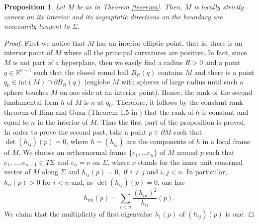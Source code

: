 \documentclass[11pt]{amsart}
\theoremstyle{plain}
\newtheorem{proposition}[theorem]{Proposition}
\numberwithin{equation}{section}
\numberwithin{theorem}{section}
\begin{document}
\begin{proposition}
	\label{lema}
	Let $M$ be as in Theorem \ref{teorema}.  Then, $M$ is locally strictly convex on its interior and its asymptotic directions on the boundary are necessarily tangent to $\Sigma$. 
\end{proposition}
\begin{proof}
First we notice that $M$ has an interior elliptic point, that is, there is an interior point of $M$ where all the principal curvatures are positive. In fact, since $M$ is not part of a hyperplane, then we easily find a radius $R>0$ and a point $q\in \mathbb{R}^{n+1}$ such that the closed round ball $B_R(q)$ contains $M$ and there is a point $q_0\in  \textrm{int} (M)\cap\partial B_R(q)$ (englobe $M$ with spheres of large radius until such a sphere touches $M$ on one side at an interior point). Hence, the rank of the second fundamental form $h$  of $M$ is $n$ at $q_0$. Therefore, it follows by the constant rank theorem of Bian and Guan (Theorem 1.5 in \cite{BG1}) that the rank of $h$ is constant and equal to $n$ in the interior of $M$. Thus the first part of the proposition is proved. In order to prove the second part,
take a point $p\in \partial M$ such that $\det (h_{ij})(p)=0$, where $h=(h_{ij})$ are the components of $h$ in a local frame of $M$. We choose an orthornormal frame $\{e_1, \ldots e_n\}$ of $M$ around $p$ such that $e_1, \ldots, e_{n-1}\in T\Sigma$ and $e_n=\nu$ on $\Sigma$, where $\nu$ stands for the inner unit conormal vector of $M$ along $\Sigma$ and $h_{ij}(p)=0,$ if $i\neq j$ and $i,j<n$. In particular, $h_{ii}(p)>0$ for $i<n$ and,  as $\det (h_{ij})(p)=0$, one has
\begin{equation}
	\label{det}
h_{nn}(p)=\sum_{i<n}\frac{(h_{in})^2}{h_{ii}}(p).
\end{equation}
We claim that the multiplicity of first eigenvalue $\lambda_1(p)$ of $(h_{ij})(p)$ is one. 


\end{proof}
\end{document}
